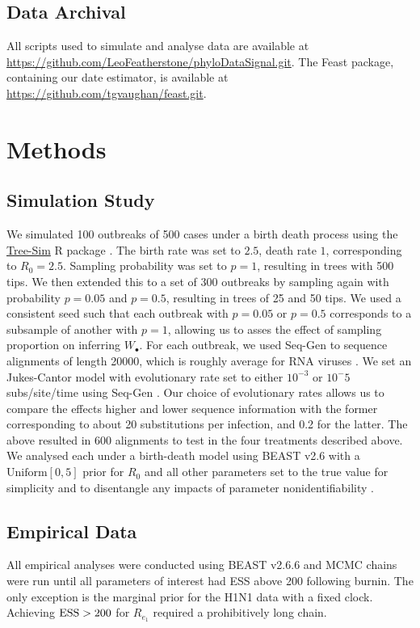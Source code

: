 \documentclass{article}
\begin{document}
\subsection*{Data Archival}
All scripts used to simulate and analyse data are available at \url{https://github.com/LeoFeatherstone/phyloDataSignal.git}. The Feast package, containing our date estimator, is available at \url{https://github.com/tgvaughan/feast.git}.
\section*{Methods}
\subsection*{Simulation Study}
We simulated 100 outbreaks of 500 cases under a birth death process using the \url{Tree-Sim} R package \citep{TreeSim}. The birth rate was set to $2.5$, death rate $1$, corresponding to $R_{0} = 2.5$. Sampling probability was set to $p=1$, resulting in trees with 500 tips. We then extended this to a set of 300 outbreaks by sampling again with probability $p=0.05$ and $p = 0.5$, resulting in trees of 25 and 50 tips. We used a consistent seed such that each outbreak with $p=0.05$ or $p=0.5$ corresponds to a subsample of another with $p=1$, allowing us to asses the effect of sampling proportion on inferring $W_{\bullet}$. For each outbreak, we used Seq-Gen to sequence alignments of length 20000, which is roughly average for RNA viruses \citep{sanjuan2010viral,rambaut_seq-gen_1997}. We set an Jukes-Cantor model with evolutionary rate set to either $10^{-3}$ or $10^-{5}$ subs/site/time using Seq-Gen \cite{rambaut_seq-gen_1997}.  Our choice of evolutionary rates allows us to compare the effects higher and lower sequence information with the former corresponding to about 20 substitutions per infection, and 0.2 for the latter. 
The above resulted in 600 alignments to test in the four treatments described above. We analysed each under a birth-death model using BEAST v2.6 \citet{bouckaert_beast_2019} with a $\textrm{Uniform}[0,5]$ prior for $R_0$ and all other parameters set to the true value for simplicity and to disentangle any impacts of parameter nonidentifiability \citep{louca2021fundamental}.

\subsection*{Empirical Data}
All empirical analyses were conducted using BEAST v2.6.6 \citep{bouckaert_beast_2019} and MCMC chains were run until all parameters of interest had ESS above 200 following burnin. The only exception is the marginal prior for the H1N1 data with a fixed clock. Achieving $\textnormal{ESS} > 200$ for $R_{e_1}$ required a prohibitively long chain. 
\end{document}
